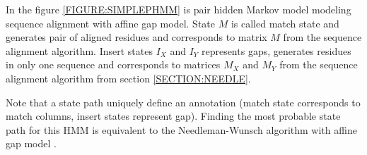 \begin{example}
In the figure \ref{FIGURE:SIMPLEPHMM} is pair hidden Markov model modeling
sequence alignment with affine gap model. State $M$ is called match state and
generates pair of aligned residues and corresponds to matrix $M$ from the sequence
alignment algorithm. Insert states $I_X$ and $I_Y$ represents gaps,
generates residues in only one sequence and corresponds to matrices $M_X$ and
$M_Y$ from the sequence alignment algorithm from section \ref{SECTION:NEEDLE}.

Note that a state path uniquely define an annotation (match state corresponds to
match columns, insert states represent gap).  Finding the most probable state
path for this HMM is equivalent to the Needleman-Wunsch algorithm with affine gap
model \cite{Durbin1998}.





\end{example}
